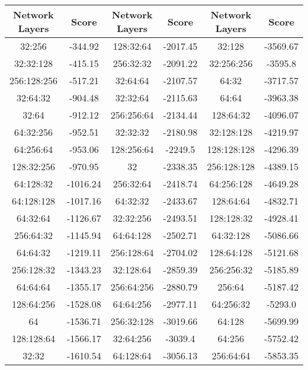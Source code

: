     
\begin{table}[h]
    \centering
    \begin{tabular}{|c|c||c|c||c|c|}
    \hline
    Network Layers & Score & Network Layers & Score & Network Layers & Score \\
    \hline
    32:256 & -344.92 & 128:32:64 & -2017.45 & 32:128 & -3569.67 \\
    \hline
    32:32:128 & -415.15 & 256:32:32 & -2091.22 & 32:256:256 & -3595.8 \\
    \hline
    256:128:256 & -517.21 & 32:64:64 & -2107.57 & 64:32 & -3717.57 \\
    \hline
    32:64:32 & -904.48 & 32:32:64 & -2115.63 & 64:64 & -3963.38 \\
    \hline
    32:64 & -912.12 & 256:256:64 & -2134.44 & 128:64:32 & -4096.07 \\
    \hline
    64:32:256 & -952.51 & 32:32:32 & -2180.98 & 32:128:128 & -4219.97 \\
    \hline
    64:256:64 & -953.06 & 128:256:64 & -2249.5 & 128:128:128 & -4296.39 \\
    \hline
    128:32:256 & -970.95 & 32 & -2338.35 & 256:128:128 & -4389.15 \\
    \hline
    64:128:32 & -1016.24 & 256:32:64 & -2418.74 & 64:256:128 & -4649.28 \\
    \hline
    64:128:128 & -1017.16 & 64:32:32 & -2433.67 & 128:64:64 & -4832.71 \\
    \hline
    64:32:64 & -1126.67 & 32:32:256 & -2493.51 & 128:128:32 & -4928.41 \\
    \hline
    256:64:32 & -1145.94 & 64:64:128 & -2502.71 & 64:32:128 & -5086.66 \\
    \hline
    64:64:32 & -1219.11 & 256:128:64 & -2704.02 & 128:64:128 & -5121.68 \\
    \hline
    256:128:32 & -1343.23 & 32:128:64 & -2859.39 & 256:256:32 & -5185.89 \\
    \hline
    64:64:64 & -1355.17 & 256:64:256 & -2880.79 & 256:64 & -5187.42 \\
    \hline
    128:64:256 & -1528.08 & 64:64:256 & -2977.11 & 64:256:32 & -5293.0 \\
    \hline
    64 & -1536.71 & 256:32:128 & -3019.66 & 64:128 & -5699.99 \\
    \hline
    128:128:64 & -1566.17 & 32:64:256 & -3039.4 & 64:256 & -5752.42 \\
    \hline
    32:32 & -1610.54 & 64:128:64 & -3056.13 & 256:64:64 & -5853.35 \\

\end{tabular}
\end{table}

